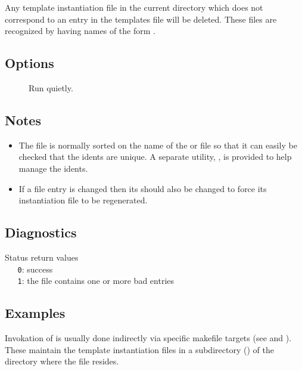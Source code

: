 Any template instantiation  file in the current directory which does
not correspond to an entry in the templates file will be deleted.  These files
are recognized by having names of the form .

\subsection*{Options}
 
\begin{description}
\item[]
   Run quietly.
\end{description}
 
\subsection*{Notes}
 
\begin{itemize}
\item
   The  file is normally sorted on the name of the 
   or  file so that it can easily be checked that the idents are
   unique.  A separate utility, , is provided to help manage
   the idents.
\item
   If a  file entry is changed then its  should
   also be changed to force its instantiation file to be regenerated.
\end{itemize}

\subsection*{Diagnostics}
 
Status return values
\\ \verb+   0+: success
\\ \verb+   1+: the  file contains one or more bad entries
 
\subsection*{Examples}
 
Invokation of  is usually done indirectly via specific makefile
targets (see  and ).  These maintain the template instantiation
files in a subdirectory () of the directory where the
 file resides. 
 
